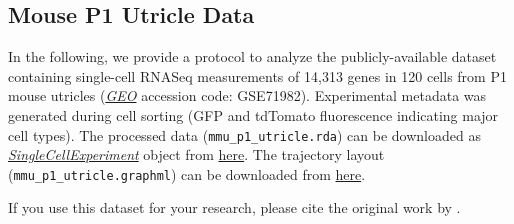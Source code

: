 \documentclass[]{book}
\theoremstyle{definition}
\theoremstyle{definition}
\theoremstyle{definition}
\theoremstyle{remark}
\begin{document}
\subsection{Mouse P1 Utricle Data}\label{mouse-p1-utricle-data}

In the following, we provide a protocol to analyze the
publicly-available dataset containing single-cell RNASeq measurements of
14,313 genes in 120 cells from P1 mouse utricles
(\href{https://www.ncbi.nlm.nih.gov/geo/}{\emph{GEO}} accession code:
GSE71982). Experimental metadata was generated during cell sorting (GFP
and tdTomato fluorescence indicating major cell types). The processed
data (\texttt{mmu\_p1\_utricle.rda}) can be downloaded as
\emph{\href{http://bioconductor.org/packages/SingleCellExperiment}{SingleCellExperiment}}
object from
\href{https://github.com/dcellwanger/CellTrails-handbook/raw/master/exdata/mmu_p1_utricle.rds}{here}.
The trajectory layout (\texttt{mmu\_p1\_utricle.graphml}) can be
downloaded from
\href{https://github.com/dcellwanger/CellTrails-handbook/raw/master/exdata/mmu_p1_utricle.graphml}{here}.

If you use this dataset for your research, please cite the original work
by \citet{burns2015}.
\end{document}
